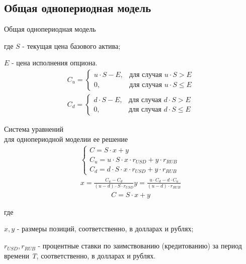 \documentclass[financial_risks_lectures.tex]{subfiles}
\begin{document}
\subsection{Общая однопериодная модель}
\begin{frame}[shrink=15]{Общая однопериодная модель}
\begin{center}
\end{center}
где
$S$ - текущая цена базового актива;

$E$ - цена исполнения опциона.
\begin{align}
C_u = \begin{cases} u \cdot S - E, & \mbox{для случая } u \cdot S > E \\ 
0, & \mbox{для случая } u \cdot S \leq E \end{cases}\\
C_d = \begin{cases} d \cdot S - E, & \mbox{для случая } d \cdot S > E \\ 
0, & \mbox{для случая } d \cdot S \leq E \end{cases}
\end{align}
\end{frame}
\begin{frame}[shrink=15]{Система уравнений\\для однопериодной модели}{и ее решение}
\begin{align}
\begin{cases} 
C = S \cdot x + y\\ 
C_u = u \cdot S \cdot x \cdot r_{USD} + y \cdot r_{RUB}\\
C_d = d \cdot S \cdot x \cdot r_{USD} + y \cdot r_{RUB}
\end{cases}\\[12pt]
x=\frac{C_u-C_d}{(u-d)\cdot S \cdot r_{USD}}
y=\frac{u \cdot C_d-d \cdot C_u}{(u-d) \cdot r_{RUB}}
\end{align}
\begin{align}
C = S \cdot x + y
\end{align}

где

$x, y$ - размеры позиций, соответственно, в долларах и рублях;

$r_{USD},r_{RUB}$ - процентные ставки по заимствованию (кредитованию) за период времени \textit{T}, соответственно, в долларах и рублях.
\end{frame}
\end{document}
